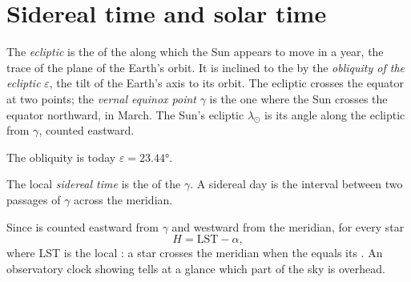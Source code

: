 \section{Sidereal time and solar time}

\begin{definition}\label{def:b1:spherical-astronomy:ecliptic}
The \emph{ecliptic} is the  of the  along which the Sun appears to move in a year, the trace of the plane
of the Earth's orbit. It is inclined to the  by the
\emph{obliquity of the ecliptic}
$\varepsilon$, the tilt of the Earth's axis to its orbit. The ecliptic
crosses the equator at two points; the \emph{vernal equinox
point} $\gamma$ is the one where the Sun crosses
the equator northward, in March. The Sun's ecliptic  $\lambda_\odot$
is its angle along the ecliptic from $\gamma$, counted eastward.
\end{definition}

The obliquity is today $\varepsilon = \ang{23.44}$.

\begin{definition}\label{def:b1:spherical-astronomy:sidereal-time}
The local \emph{sidereal time} is the  of the
 $\gamma$. A sidereal day is the interval between two
passages of $\gamma$ across the meridian.
\end{definition}

Since  is counted eastward from $\gamma$ and 
westward from the meridian, for every star
\[
  H = \mathrm{LST} - \alpha ,
\]
where LST is the local : a star crosses the meridian when the
 equals its . An observatory clock showing
 tells at a glance which part of the sky is overhead.

